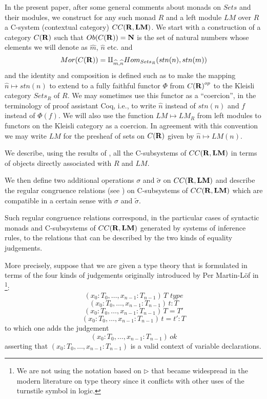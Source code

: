\documentclass[11pt]{article}
\newcommand{\nn}{{\bf N\rm}}
\newcommand{\rr}{{\bf R}}
\newcommand{\lm}{{\bf LM}}
\newcommand{\wt}{\widetilde}
\newcommand{\wh}{\widehat}
\begin{document}
In the present paper, after some general comments about monads on $Sets$ and their modules, we construct for any such monad $R$ and a left module $LM$ over $R$ a C-system (contextual category) $CC(\rr,\lm)$.  We start with a construction of a category ${C(\rr)}$ such that $Ob({C(\rr)})=\nn$ is the set of natural numbers whose elements we will denote as $\wh{m}$, $\wh{n}$ etc. and
%
$$Mor({C(\rr)})=\amalg_{\wh{m},\wh{n}}Hom_{Sets_R}(stn(n),stn(m))$$
%
and the identity and composition is defined such as to make the mapping $\wh{n}\mapsto stn(n)$ to extend to a fully faithful functor $\Phi$ from ${C(\rr)}^{op}$ to the Kleisli category $Sets_R$ of $R$.  We may sometimes  use this functor as a ``coercion'', in the terminology of proof assistant Coq, i.e., to write $\wh{n}$ instead of $stn(n)$ and $f$ instead of $\Phi(f)$. We will also use the function $LM\mapsto LM_R$ from left modules to functors on the Kleisli category as a coercion. In agreement with this convention we may write $LM$ for the presheaf of sets on ${C(\rr)}$ given by $\wh{n}\mapsto LM(n)$.  

We describe, using the results of \cite{Csubsystems}, all the C-subsystems of $CC(\rr,\lm)$ in terms of objects directly associated with $R$ and $LM$. 

We then define two additional operations $\sigma$ and $\wt{\sigma}$ on $CC(\rr,\lm)$ and describe the regular congruence relations (see \cite{Csubsystems}) on C-subsystems of $CC(\rr,\lm)$ which are compatible in a certain sense with $\sigma$ and $\wt{\sigma}$.

Such regular congruence relations correspond, in the particular cases of syntactic monads and C-subsystems of $CC(\rr,\lm)$ generated by systems of inference rules, to the relations that can be described by the two kinds of equality judgements. 

More precisely, suppose that we are given a type theory that is formulated in terms of the four kinds of judgements originally introduced by Per Martin-L\"{o}f in \cite[p.161]{MLTT79}\footnote{We are not using the notation based on $\rhd$ that became widespread in the modern literature on type theory since it conflicts with other uses of the turnstile symbol in logic.}:
%
$$(x_0:T_0,\dots,x_{n-1}:T_{n-1})\,T\,\,type$$
$$(x_0:T_0,\dots,x_{n-1}:T_{n-1})\,t:T$$
$$(x_0:T_0,\dots,x_{n-1}:T_{n-1})\,T=T'$$
$$(x_0:T_0,\dots,x_{n-1}:T_{n-1})\,t=t':T$$
%
to which one adds the judgement
%
$$(x_0:T_0,\dots,x_{n-1}:T_{n-1})\,ok$$
%
asserting that $(x_0:T_0,\dots,x_{n-1}:T_{n-1})$ is a valid context of variable declarations.
\end{document}
